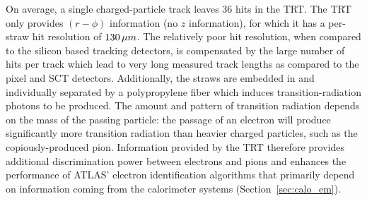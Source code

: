 On average, a single charged-particle track leaves 36 hits in the TRT.
The TRT only provides $(r-\phi)$ information (no $z$ information),
for which it has a per-straw hit resolution of $130\,\mu m$.
The relatively poor hit resolution, when compared to the silicon based
tracking detectors, is compensated by the large number of hits per track which
lead to very long measured track lengths as compared to the pixel and SCT detectors.
Additionally, the straws are embedded in and individually separated by
a polypropylene fiber which induces transition-radiation photons to be produced.
The amount and pattern of transition radiation depends on the mass of the passing
particle: the passage of an electron will produce significantly more transition radiation
than heavier charged particles, such as the copiously-produced pion.
Information provided by the TRT therefore provides additional discrimination
power between electrons and pions and enhances the performance of ATLAS' electron identification algorithms
that primarily depend on information coming from the calorimeter systems (Section~\ref{sec:calo_em}).
